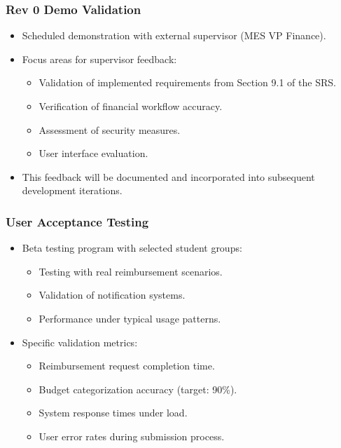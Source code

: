 \documentclass[12pt, titlepage]{article}
\begin{document}
\subsubsection*{Rev 0 Demo Validation}
\begin{itemize}
   \item Scheduled demonstration with external supervisor (MES VP Finance).
   \item Focus areas for supervisor feedback:
   \begin{itemize}
       \item Validation of implemented requirements from Section 9.1 of the SRS.
       \item Verification of financial workflow accuracy.
       \item Assessment of security measures.
       \item User interface evaluation.
   \end{itemize}
   \item This feedback will be documented and incorporated into subsequent development iterations.
\end{itemize}

\subsubsection*{User Acceptance Testing}
\begin{itemize}
   \item Beta testing program with selected student groups:
   \begin{itemize}
       \item Testing with real reimbursement scenarios.
       \item Validation of notification systems.
       \item Performance under typical usage patterns.
   \end{itemize}
   \item Specific validation metrics:
   \begin{itemize}
       \item Reimbursement request completion time.
       \item Budget categorization accuracy (target: 90\%).
       \item System response times under load.
       \item User error rates during submission process.
   \end{itemize}
\end{itemize}
\end{document}
